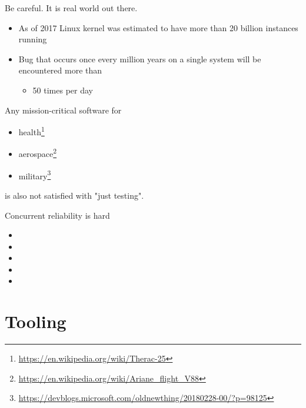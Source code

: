 \begin{frame}{Be careful. It is real world out there.}

\begin{itemize}
  \item As of 2017 Linux kernel was estimated to have more than 20 billion instances running
  \item Bug that occurs once every million years on a single system will be encountered more than 
  \begin{itemize}
    \pause \item 50 times per day
  \end{itemize}
\end{itemize}

\pause

Any mission-critical software for
\begin{itemize}
  \item health\footnote<3->{\tiny\url{https://en.wikipedia.org/wiki/Therac-25}}
  \item aerospace\footnote<3->{\tiny\url{https://en.wikipedia.org/wiki/Ariane_flight_V88}}
  \item military\footnote<3->{\tiny\url{https://devblogs.microsoft.com/oldnewthing/20180228-00/?p=98125}}
\end{itemize}
is also not satisfied with "just testing".
\end{frame}

\begin{frame}[t,fragile]{Concurrent reliability is hard}
\begin{itemize}
  \item \alarmOne
  \item \alarmTwo
  \item \alarmThree
  \item \alarmFour
  \item \alarmFive
\end{itemize}
\end{frame}


\section{Tooling}
\showTOC

